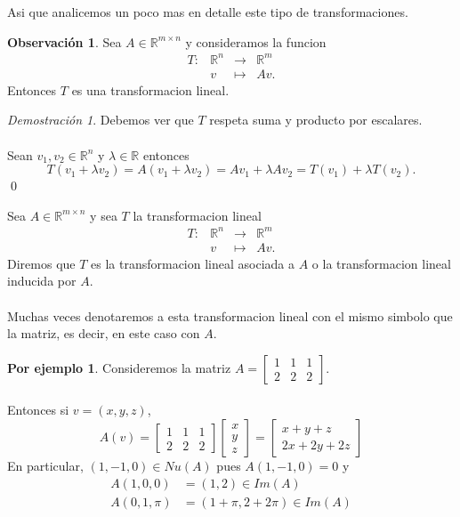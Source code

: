 \documentclass{article}
\theoremstyle{definition}
\theoremstyle{definition}
\newtheorem*{obs}{Observación}
\newtheorem*{ej}{Por ejemplo}
\theoremstyle{remark}
\newtheorem*{demo}{Demostración}
\begin{document}
Asi que analicemos un poco mas en detalle este tipo de transformaciones. \pagebreak \begin{obs}
  Sea $A \in \mathbb{R}^{m \times n}$ y consideramos la funcion \[
    \begin{array}{lccc}
      T: & \mathbb{R}^n & \to & \mathbb{R}^m \\
         &v & \mapsto &Av.
    \end{array}
  \]
  Entonces $T$ es una transformacion lineal.
\end{obs}
\begin{demo}
  Debemos ver que $T$ respeta suma y producto por escalares. \\\\ Sean $v_1, v_2 \in \mathbb{R}^n$ y $\lambda \in \mathbb{R}$ entonces \[
T(v_1+
\lambda v_2) = A(v_1 + \lambda v_2 )= Av_1 + \lambda Av_2 =T(v_1 ) + \lambda T(v_2).
  \]
  \qed
\end{demo}
\begin{defi}
  Sea $A \in \mathbb{R}^{m \times n}$ y sea $T$ la transformacion lineal \[
    \begin{array}{lccc}
      T: & \mathbb{R}^n & \to & \mathbb{R}^m \\
         &v & \mapsto &Av.
    \end{array}
  \]
  Diremos que $T$ es la transformacion lineal asociada a $A$ o la transformacion lineal inducida por $A$. \\\\ 
  Muchas veces denotaremos a esta transformacion lineal con el mismo simbolo que la matriz, es decir, en este caso con $A$.
\end{defi}
\begin{ej}
  Consideremos la matriz $A=\begin{bmatrix}1 & 1 & 1 \\ 2 & 2 & 2 \end{bmatrix}$. \\\\ Entonces si $v = (x,y,z)$, \[
  A(v)=\begin{bmatrix}1 & 1 & 1 \\ 2 & 2 & 2 \end{bmatrix}\begin{bmatrix}x \\ y \\ z \end{bmatrix} = \begin{bmatrix} x + y + z \\ 2x + 2y + 2z \end{bmatrix}
\]
En particular, $(1,-1,0) \in Nu(A)$ pues $A(1,-1,0)=0$ y \[
  \begin{aligned}
    A(1,0,0)&=(1,2) \in Im(A) \\
    A(0,1,\pi )&= (1+\pi , 2 +2\pi) \in Im(A)
  \end{aligned}
\]
\end{ej}
\end{document}
